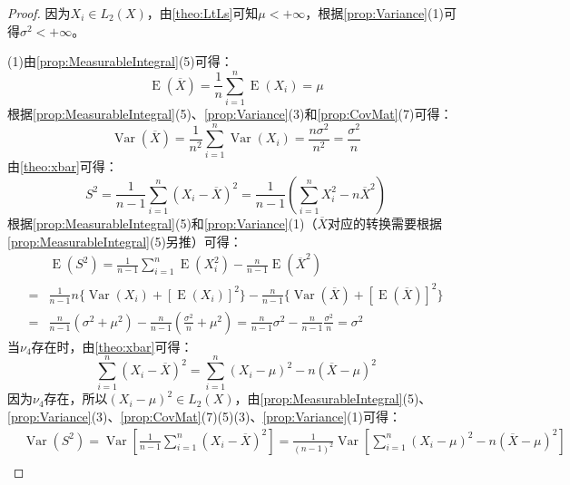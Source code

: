 \begin{proof}
	因为$X_i\in L_2(X)$，由\cref{theo:LtLs}可知$\mu<+\infty$，根据\cref{prop:Variance}(1)可得$\sigma^2<+\infty$。\par
	(1)由\cref{prop:MeasurableIntegral}(5)可得：
	\begin{equation*}
		\operatorname{E}(\overline{X})=\frac{1}{n}\sum_{i=1}^{n}\operatorname{E}(X_i)=\mu
	\end{equation*}
	根据\cref{prop:MeasurableIntegral}(5)、\cref{prop:Variance}(3)和\cref{prop:CovMat}(7)可得：
	\begin{equation*}
		\operatorname{Var}(\overline{X})=\frac{1}{n^2}\sum_{i=1}^{n}\operatorname{Var}(X_i)=\frac{n\sigma^2}{n^2}=\frac{\sigma^2}{n}
	\end{equation*}
	由\cref{theo:xbar}可得：
	\begin{equation*}
		S^2=\frac{1}{n-1}\sum_{i=1}^{n}(X_i-\overline{X})^2=\frac{1}{n-1}\left(\sum_{i=1}^{n}X_i^2-n\overline{X}^2\right)
	\end{equation*}
	根据\cref{prop:MeasurableIntegral}(5)和\cref{prop:Variance}(1)（$\overline{X}$对应的转换需要根据\cref{prop:MeasurableIntegral}(5)另推）可得：
	\begin{align*}
		&\operatorname{E}(S^2)=\frac{1}{n-1}\sum_{i=1}^{n}\operatorname{E}(X_i^2)-\frac{n}{n-1}\operatorname{E}(\overline{X}^2) \\
		=&\frac{1}{n-1}n\{\operatorname{Var}(X_i)+[\operatorname{E}(X_i)]^2\}-\frac{n}{n-1}\{\operatorname{Var}(\overline{X})+[\operatorname{E}(\overline{X})]^2\} \\
		=&\frac{n}{n-1}(\sigma^2+\mu^2)-\frac{n}{n-1}\left(\frac{\sigma^2}{n}+\mu^2\right)=\frac{n}{n-1}\sigma^2-\frac{n}{n-1}\frac{\sigma^2}{n}=\sigma^2
	\end{align*}
	当$\nu_4$存在时，由\cref{theo:xbar}可得：
	\begin{equation*}
		\sum_{i=1}^{n}(X_i-\overline{X})^2=\sum_{i=1}^{n}(X_i-\mu)^2-n(\overline{X}-\mu)^2
	\end{equation*}
	因为$\nu_4$存在，所以$(X_i-\mu)^2\in L_2(X)$，由\cref{prop:MeasurableIntegral}(5)、\cref{prop:Variance}(3)、\cref{prop:CovMat}(7)(5)(3)、\cref{prop:Variance}(1)可得：
	\begin{align*}
		&\operatorname{Var}(S^2)=\operatorname{Var}\left[\frac{1}{n-1}\sum_{i=1}^{n}(X_i-\overline{X})^2\right]=\frac{1}{(n-1)^2}\operatorname{Var}\left[\sum_{i=1}^{n}(X_i-\mu)^2-n(\overline{X}-\mu)^2\right] \\

\end{align*}
\end{proof}
